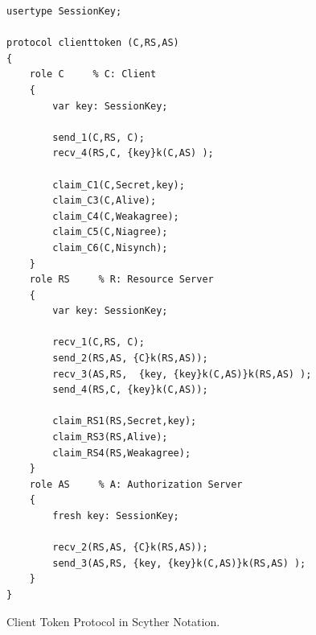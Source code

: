 \documentclass[peerreview, a4paper, 7pt]{IEEEtran}
\begin{document}
\begin{figure}[!htbp]
\begin{lstlisting}
usertype SessionKey;

protocol clienttoken (C,RS,AS)
{
    role C     % C: Client
    {
        var key: SessionKey; 

        send_1(C,RS, C);
        recv_4(RS,C, {key}k(C,AS) );

        claim_C1(C,Secret,key);
        claim_C3(C,Alive);
        claim_C4(C,Weakagree);
        claim_C5(C,Niagree);
        claim_C6(C,Nisynch);
    }        
    role RS     % R: Resource Server
    {
        var key: SessionKey; 

        recv_1(C,RS, C);
        send_2(RS,AS, {C}k(RS,AS)); 
        recv_3(AS,RS,  {key, {key}k(C,AS)}k(RS,AS) ); 
        send_4(RS,C, {key}k(C,AS)); 

        claim_RS1(RS,Secret,key);
        claim_RS3(RS,Alive);
        claim_RS4(RS,Weakagree);
    }    
    role AS     % A: Authorization Server
    {
        fresh key: SessionKey;

        recv_2(RS,AS, {C}k(RS,AS)); 
        send_3(AS,RS, {key, {key}k(C,AS)}k(RS,AS) ); 
    }    
}
\end{lstlisting}
\caption{Client Token Protocol in Scyther Notation.}
\label{scyther-code-figure}
\end{figure}
\end{document}
